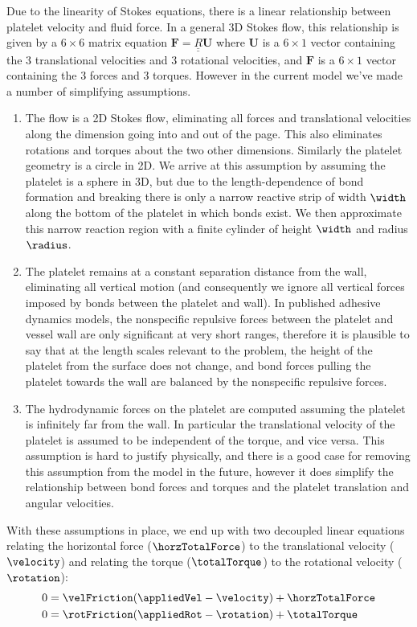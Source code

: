 Due to the linearity of Stokes equations, there is a linear
relationship between platelet velocity and fluid force. In a general
3D Stokes flow, this relationship is given by a $6 \times 6$ matrix
equation $\mathbf{F} = \underline{\underline{R}} \mathbf{U}$ where
$\mathbf{U}$ is a $6 \times 1$ vector containing the 3 translational
velocities and 3 rotational velocities, and $\mathbf{F}$ is a
$6 \times 1$ vector containing the 3 forces and 3 torques. However in
the current model we've made a number of simplifying assumptions.
\begin{enumerate}
\item The flow is a 2D Stokes flow, eliminating all forces and
  translational velocities along the dimension going into and out of
  the page. This also eliminates rotations and torques about the two
  other dimensions. Similarly the platelet geometry is a circle in
  2D. We arrive at this assumption by assuming the platelet is a
  sphere in 3D, but due to the length-dependence of bond formation and
  breaking there is only a narrow reactive strip of width $\width$
  along the bottom of the platelet in which bonds exist. We then
  approximate this narrow reaction region with a finite cylinder of
  height $\width$ and radius $\radius$. 
\item The platelet remains at a constant separation distance from the
  wall, eliminating all vertical motion (and consequently we ignore
  all vertical forces imposed by bonds between the platelet and
  wall). In published adhesive dynamics models, the nonspecific
  repulsive forces between the platelet and vessel wall are only
  significant at very short ranges, therefore it is plausible to say
  that at the length scales relevant to the problem, the height of the
  platelet from the surface does not change, and bond forces pulling
  the platelet towards the wall are balanced by the nonspecific
  repulsive forces.
\item The hydrodynamic forces on the platelet are computed assuming
  the platelet is infinitely far from the wall. In particular the
  translational velocity of the platelet is assumed to be independent
  of the torque, and vice versa. This assumption is hard to justify
  physically, and there is a good case for removing this assumption
  from the model in the future, however it does simplify the
  relationship between bond forces and torques and the platelet
  translation and angular velocities. 
\end{enumerate}
With these assumptions in place, we end up with two decoupled linear
equations relating the horizontal force ($\horzTotalForce$) to the
translational velocity ($\velocity$) and relating the torque
($\totalTorque$) to the rotational velocity ($\rotation$):
\begin{align}
  \label{eq:force-bal}
  0 &= \velFriction(\appliedVel - \velocity) + \horzTotalForce \\
  \label{eq:torque-bal}
  0 &= \rotFriction(\appliedRot - \rotation) + \totalTorque
\end{align}

